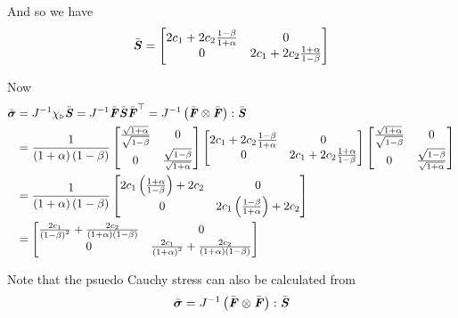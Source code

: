 And so we have
\begin{equation}
  \bar{\boldsymbol{\mathit{S}}}=\begin{bmatrix}
  2c_{1}+2c_{2}\frac{1-\beta}{1+\alpha} & 0 \\
  0 & 2c_{1}+2c_{2}\frac{1+\alpha}{1-\beta}
  \end{bmatrix} 
\end{equation}

Now
\begin{equation}
  \begin{split}
    \bar{\boldsymbol{\mathit{\sigma}}}&={J}^{-1} \chi_{\triangleright}\bar{\boldsymbol{\mathit{S}}} ={J}^{-1}\bar{\boldsymbol{\mathit{F}}}\bar{\boldsymbol{\mathit{S}}} {\bar{\boldsymbol{\mathit{F}}}}^{ \top } ={J}^{-1} \left(  \bar{\boldsymbol{\mathit{F}}} \otimes \bar{\boldsymbol{\mathit{F}}}  \right) : \bar{\boldsymbol{\mathit{S}}} \\
    &=\dfrac{1}{\left( 1+\alpha \right)\left( 1-\beta \right)}\begin{bmatrix}
      \frac{\sqrt{1+\alpha}}{\sqrt{1-\beta}} & 0  \\
      0 & \frac{\sqrt{1-\beta}}{\sqrt{1+\alpha}}
    \end{bmatrix}\begin{bmatrix}
      2c_{1}+2c_{2}\frac{1-\beta}{1+\alpha} & 0 \\
      0 & 2c_{1}+2c_{2}\frac{1+\alpha}{1-\beta}
    \end{bmatrix}\begin{bmatrix}
      \frac{\sqrt{1+\alpha}}{\sqrt{1-\beta}} & 0  \\
      0 & \frac{\sqrt{1-\beta}}{\sqrt{1+\alpha}}
    \end{bmatrix} \\
    &=\dfrac{1}{\left( 1+\alpha \right)\left( 1-\beta \right)}\begin{bmatrix}
      2c_{1}\left( \frac{1+\alpha}{1-\beta} \right)+2c_{2} & 0 \\
      0 & 2c_{1}\left( \frac{1-\beta}{1+\alpha} \right)+2c_{2}
    \end{bmatrix} \\
    &=\begin{bmatrix}
      \frac{2c_{1}}{\left( 1-\beta \right)^{2}}+\frac{2c_{2}}{\left( 1+\alpha \right)\left( 1-\beta \right)} & 0 \\
      0 & \frac{2c_{1}}{\left( 1+\alpha \right)^{2}}+\frac{2c_{2}}{\left( 1+\alpha \right)\left( 1-\beta \right)}
    \end{bmatrix}
  \end{split}
\end{equation}

Note that the psuedo Cauchy stress can also be calculated from
\begin{equation}
  \bar{\boldsymbol{\mathit{\sigma}}}={J}^{-1} \left(  \bar{\boldsymbol{\mathit{F}}} \otimes \bar{\boldsymbol{\mathit{F}}}  \right) : \bar{\boldsymbol{\mathit{S}}} \\
\end{equation}

